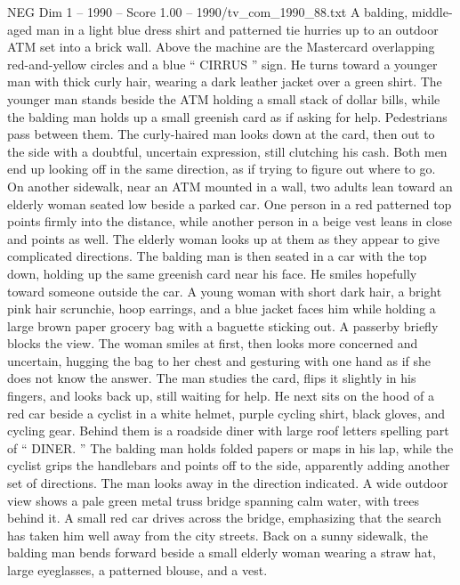 \begin{textsample}{NEG Dim 1 – 1990 – Score 1.00 – 1990/tv\_com\_1990\_88.txt}  \label{ex:f1_neg_058}
A balding, middle-aged man in a light blue dress shirt and patterned tie hurries up to an outdoor ATM set into a brick wall.
Above the machine are the Mastercard overlapping red-and-yellow circles and a blue “ CIRRUS ” sign.
He turns toward a younger man with thick curly hair, wearing a dark leather jacket over a green shirt.
The younger man stands beside the ATM holding a small stack of dollar bills, while the balding man holds up a small greenish card as if asking for help.
Pedestrians pass between them.
The curly-haired man looks down at the card, then out to the side with a doubtful, uncertain expression, still clutching his cash.
Both men end up looking off in the same direction, as if trying to figure out where to go.
On another sidewalk, near an ATM mounted in a wall, two adults lean toward an elderly woman seated low beside a parked car.
One person in a red patterned top points firmly into the distance, while another person in a beige vest leans in close and points as well.
The elderly woman looks up at them as they appear to give complicated directions.
The balding man is then seated in a car with the top down, holding up the same greenish card near his face.
He smiles hopefully toward someone outside the car.
A young woman with short dark hair, a bright pink hair scrunchie, hoop earrings, and a blue jacket faces him while holding a large brown paper grocery bag with a baguette sticking out.
A passerby briefly blocks the view.
The woman smiles at first, then looks more concerned and uncertain, hugging the bag to her chest and gesturing with one hand as if she does not know the answer.
The man studies the card, flips it slightly in his fingers, and looks back up, still waiting for help.
He next sits on the hood of a red car beside a cyclist in a white helmet, purple cycling shirt, black gloves, and cycling gear.
Behind them is a roadside diner with large roof letters spelling part of “ DINER. ” The balding man holds folded papers or maps in his lap, while the cyclist grips the handlebars and points off to the side, apparently adding another set of directions.
The man looks away in the direction indicated.
A wide outdoor view shows a pale green metal truss bridge spanning calm water, with trees behind it.
A small red car drives across the bridge, emphasizing that the search has taken him well away from the city streets.
Back on a sunny sidewalk, the balding man bends forward beside a small elderly woman wearing a straw hat, large eyeglasses, a patterned blouse, and a vest.

\end{textsample}

